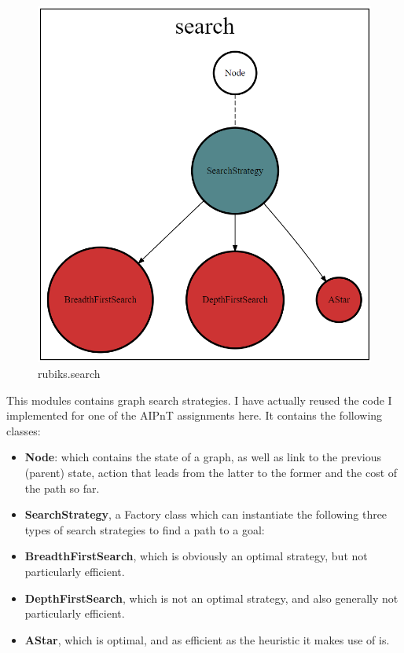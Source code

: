 \begin{figure}[H]
\centering
\includegraphics[scale=0.22]{./Figures/codebasesearch}
\caption[Codebase]{rubiks.search}
\label{fig:Codebasesearch}
\end{figure}
This modules contains graph search strategies. I have actually reused the code I implemented for one of the AIPnT assignments here. It contains the following classes:
\begin{itemize}
\item \textbf{Node}: which contains the state of a graph, as well as link to the previous (parent) state, action that leads from the latter to the former and the cost of the path so far.
\item \textbf{SearchStrategy}, a Factory class which can instantiate the following three types of search strategies to find a path to a goal:
\item \textbf{BreadthFirstSearch}, which is obviously an optimal strategy, but not particularly efficient.
\item \textbf{DepthFirstSearch}, which is not an optimal strategy, and also generally not particularly efficient.
\item \textbf{AStar}, which is optimal, and as efficient as the heuristic it makes use of is.
\end{itemize}

